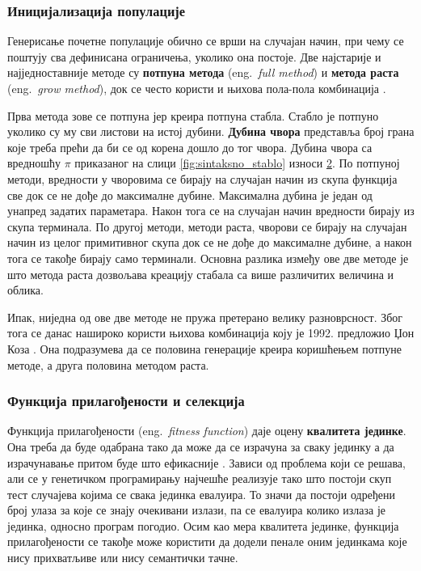 \documentclass[a4paper]{article}
\begin{document}
\subsubsection{Иницијализација популације}

Генерисање почетне популације обично се врши на случајан начин, при чему се поштују сва дефинисана ограничења, уколико она постоје. Две најстарије и најједноставније методе су \textbf{потпуна метода} (eng.~{\em full method}) и \textbf{метода раста} (eng.~{\em grow method}), док се често користи и њихова пола-пола комбинација \cite{fieldGuidetoGP}. \newline

Прва метода зове се потпуна јер креира потпуна стабла. Стабло је потпуно уколико су му сви листови на истој дубини. \textbf{Дубина чвора} представља број грана које треба прећи да би се од корена дошло до тог чвора. Дубина чвора са вредношћу $\pi$ приказаног на слици \ref{fig:sintaksno_stablo} износи \underline{2}. По потпуној методи, вредности у чворовима се бирају на случајан начин из скупа функција све док се не дође до максималне дубине. Максимална дубина је један од унапред задатих параметара. Након тога се на случајан начин вредности бирају из скупа терминала. По другој методи, методи раста, чворови се бирају на случајан начин из целог примитивног скупа док се не дође до максималне дубине, а након тога се такође бирају само терминали. Основна разлика између ове две методе је што метода раста дозвољава креацију стабала са више различитих величина и облика.\newline

Ипак, ниједна од ове две методе не пружа претерано велику разноврсност. Због тога се данас нашироко користи њихова комбинација коју је 1992. предложио Џон Коза \cite{robo2}. Она подразумева да се половина генерације креира коришћењем потпуне методе, а друга половина методом раста.

\subsubsection{Функција прилагођености и селекција}

Функција прилагођености (eng.~{\em fitness function}) даје оцену \textbf{квалитета јединке}. Она треба да буде одабрана тако да може да се израчуна за сваку јединку а да израчунавање притом буде што ефикасније \cite{vi}. Зависи од проблема који се решава, али се у генетичком програмирању најчешће реализује тако што постоји скуп тест случајева којима се свака јединка евалуира. То значи да постоји одређени број улаза за које се знају очекивани излази, па се евалуира колико излаза је јединка, односно програм погодио.
Осим као мера квалитета јединке, функција прилагођености се такође може користити да додели пенале оним јединкама које нису прихватљиве или нису семантички тачне.\newline
\end{document}
